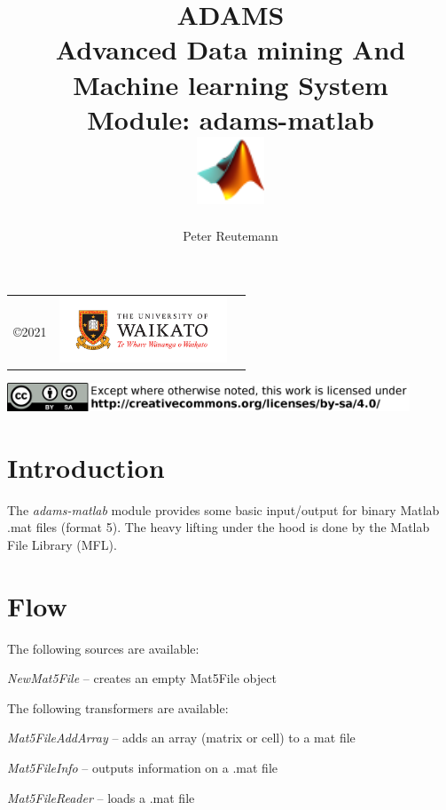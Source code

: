 \documentclass[a4paper]{book}
\title{
  \textbf{ADAMS} \\
  {\Large \textbf{A}dvanced \textbf{D}ata mining \textbf{A}nd \textbf{M}achine
  learning \textbf{S}ystem} \\
  {\Large Module: adams-matlab} \\
  \vspace{1cm}
  \includegraphics[width=2cm]{images/matlab-module.png} \\
}
\author{
  Peter Reutemann
}
\begin{document}
\begin{titlepage}
\maketitle

\thispagestyle{empty}
\center
\begin{table}[b]
	\begin{tabular}{c l l}
		\parbox[c][2cm]{2cm}{\copyright 2021} &
		\parbox[c][2cm]{5cm}{\includegraphics[width=5cm]{images/coat_of_arms.pdf}} \\
	\end{tabular}
	\includegraphics[width=12cm]{images/cc.png} \\
\end{table}

\end{titlepage}

\tableofcontents

\chapter{Introduction}
The \textit{adams-matlab} module provides some basic input/output for binary
Matlab .mat files (format 5). The heavy lifting under the hood is done
by the Matlab File Library (MFL)\cite{mfl}.


\chapter{Flow}
The following sources are available:
\begin{tight_itemize}
  \item \textit{NewMat5File} -- creates an empty Mat5File object
\end{tight_itemize}

The following transformers are available:
\begin{tight_itemize}
  \item \textit{Mat5FileAddArray} -- adds an array (matrix or cell) to a mat file
  \item \textit{Mat5FileInfo} -- outputs information on a .mat file
  \item \textit{Mat5FileReader} -- loads a .mat file
\end{tight_itemize}
\end{document}
